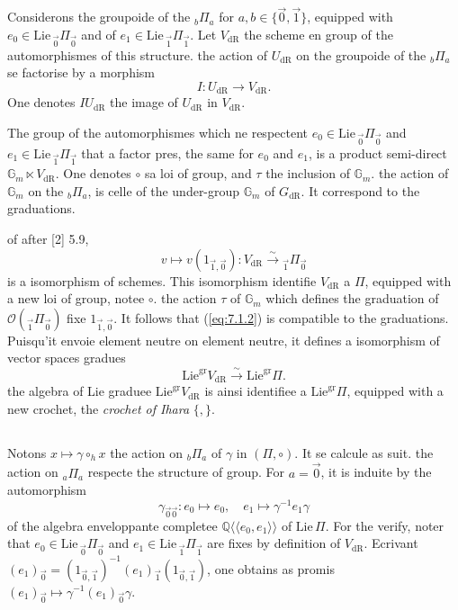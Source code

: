 \documentclass[11pt,a4paper]{article}
\theoremstyle{plain}
\theoremstyle{definition}
\newcommand{\Q}{\mathbb{Q}}
\newcommand{\Gm}{\mathbb{G}_m}
\newcommand{\dR}{\mathrm{dR}}
\newcommand{\gr}{\mathrm{gr}}
\begin{document}
Considerons the groupoide of the ${}_b\Pi_a$ for $a,b \in \{\vec{0},\vec{1}\}$, equipped with $e_0 \in \mathrm{Lie}\,{}_{\vec{0}}\Pi_{\vec{0}}$ and of $e_1 \in \mathrm{Lie}\,{}_{\vec{1}}\Pi_{\vec{1}}$. Let $V_{\dR}$ the scheme en group of the automorphismes of this structure. the action of $U_{\dR}$ on the groupoide of the ${}_b\Pi_a$ se factorise by a morphism
\begin{equation}\label{eq:7.1.1}
I: U_{\dR} \to V_{\dR}.
\end{equation}
One denotes $IU_{\dR}$ the image of $U_{\dR}$ in $V_{\dR}$.

The group of the automorphismes which ne respectent $e_0 \in \mathrm{Lie}\,{}_{\vec{0}}\Pi_{\vec{0}}$ and $e_1 \in \mathrm{Lie}\,{}_{\vec{1}}\Pi_{\vec{1}}$ that a factor pres, the same for $e_0$ and $e_1$, is a product semi-direct $\Gm \ltimes V_{\dR}$. One denotes $\circ$ sa loi of group, and $\tau$ the inclusion of $\Gm$. the action of $\Gm$ on the ${}_b\Pi_a$, is celle of the under-group $\Gm$ of $G_{\dR}$. It correspond to the graduations.

of after [2] 5.9,
\begin{equation}\label{eq:7.1.2}
v \mapsto v(1_{\vec{1},\vec{0}}): V_{\dR} \xrightarrow{\sim} {}_{\vec{1}}\Pi_{\vec{0}}
\end{equation}
is a isomorphism of schemes. This isomorphism identifie $V_{\dR}$ a $\Pi$, equipped with a new loi of group, notee $\circ$. the action $\tau$ of $\Gm$ which defines the graduation of $\mathcal{O}({}_{\vec{1}}\Pi_{\vec{0}})$ fixe $1_{\vec{1},\vec{0}}$. It follows that (\ref{eq:7.1.2}) is compatible to the graduations. Puisqu'it envoie element neutre on element neutre, it defines a isomorphism of vector spaces gradues
\begin{equation}\label{eq:7.1.3}
\mathrm{Lie}^{\gr} V_{\dR} \xrightarrow{\sim} \mathrm{Lie}^{\gr} \Pi.
\end{equation}
the algebra of Lie graduee $\mathrm{Lie}^{\gr} V_{\dR}$ is ainsi identifiee a $\mathrm{Lie}^{\gr} \Pi$, equipped with a new crochet, the \emph{crochet of Ihara} $\{,\}$.

\subsection{}\label{ssec:7.2}

Notons $x \mapsto \gamma \circ_h x$ the action on ${}_b\Pi_a$ of $\gamma$ in $(\Pi, \circ)$. It se calcule as suit. the action on ${}_a\Pi_a$ respecte the structure of group. For $a = \vec{0}$, it is induite by the automorphism
\begin{equation}\label{eq:7.2.1}
\gamma_{\vec{0}\vec{0}}: e_0 \mapsto e_0, \quad e_1 \mapsto \gamma^{-1} e_1 \gamma
\end{equation}
of the algebra enveloppante completee $\Q\langle\langle e_0,e_1 \rangle\rangle$ of $\mathrm{Lie}\,\Pi$. For the verify, noter that $e_0 \in \mathrm{Lie}\,{}_{\vec{0}}\Pi_{\vec{0}}$ and $e_1 \in \mathrm{Lie}\,{}_{\vec{1}}\Pi_{\vec{1}}$ are fixes by definition of $V_{\dR}$. Ecrivant $(e_1)_{\vec{0}} = (1_{\vec{0},\vec{1}})^{-1} (e_1)_{\vec{1}} (1_{\vec{0},\vec{1}})$, one obtains as promis $(e_1)_{\vec{0}} \mapsto \gamma^{-1} (e_1)_{\vec{0}} \gamma$.
\end{document}
